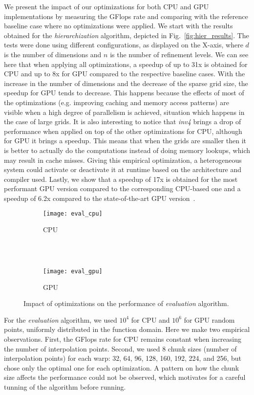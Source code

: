 We present the impact of our optimizations for both CPU and GPU implementations
by measuring the GFlops rate and comparing with the reference baseline case
where no optimizations were applied. We start with the results obtained for the
\textit{hierarchization} algorithm, depicted in Fig.~\ref{fig:hier_results}. The
tests were done using different configurations, as displayed on the X-axis,
where $d$ is the number of dimensions and $n$ is the number of refinement
levels. We can see here that when applying all optimizations, a speedup of up to
31x is obtained for CPU and up to 8x for GPU compared to the respective baseline
cases. With the increase in the number of dimensions and the decrease of the
sparse grid size, the speedup for GPU tends to decrease. This happens because
the effects of most of the optimizations (e.g. improving caching and memory
access patterns) are visible when a high degree of parallelism is achieved,
situation which happens in the case of large grids. It is also interesting to
notice that \textit{inv4} brings a drop of performance when applied on top of
the other optimizations for CPU, although for GPU it brings a speedup. This
means that when the grids are smaller then it is better to actually do the
computations instead of doing memory lookups, which may result in cache misses.
Giving this empirical optimization, a heterogeneous system could activate or
deactivate it at runtime based on the architecture and compiler used. Lastly, we
show that a speedup of 17x is obtained for the most performant GPU version
compared to the corresponding CPU-based one and a speedup of 6.2x compared to
the state-of-the-art GPU version~\cite{Murarasu:2011:CDS:1941553.1941559}.

\begin{figure}[t]
  \begin{subfigure}[b]{1\linewidth}
    \centering
    \texttt{[image: eval\_cpu]} \\
    \caption{CPU}
  \end{subfigure}
  \\ \\
  \begin{subfigure}[b]{1\linewidth}
    \centering
    \texttt{[image: eval\_gpu]}
    \caption{GPU}
  \end{subfigure}
  \caption{Impact of optimizations on the performance of \textit{evaluation} algorithm.}
  \label{fig:eval_results}
\end{figure}

For the \textit{evaluation} algorithm, we used $10^{4}$ for CPU and $10^{6}$
for GPU random points, uniformly distributed in the function domain. Here we
make two empirical observations. First, the GFlops rate for CPU remains constant
when increasing the number of interpolation points. Second, we used 8 chunk
sizes (number of interpolation points) for each warp: 32, 64, 96, 128, 160, 192,
224, and 256, but chose only the optimal one for each optimization. A pattern on
how the chunk size affects the performance could not be observed, which
motivates for a careful tunning of the algorithm before running.

